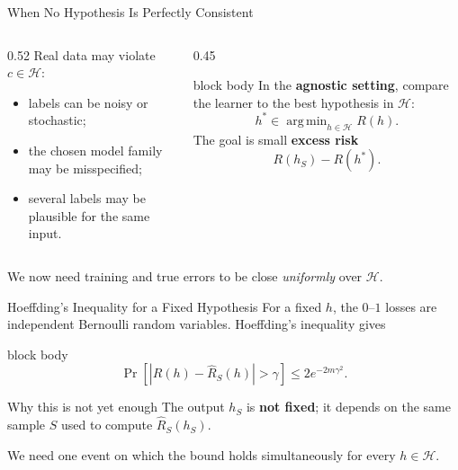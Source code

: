 \documentclass[aspectratio=169,10pt]{beamer}
\DeclareMathOperator*{\argmin}{arg\,min}
\newcommand{\Hc}{\mathcal{H}}
\begin{document}
\begin{frame}[t]{When No Hypothesis Is Perfectly Consistent}
  \vspace{0.18cm}
  \begin{columns}[T,totalwidth=\textwidth]
    \begin{column}{0.52\textwidth}
      {\normalsize Real data may violate $c\in\Hc$:}
      \begin{itemize}
        \setlength{\itemsep}{0.28cm}
        \item labels can be noisy or stochastic;
        \item the chosen model family may be misspecified;
        \item several labels may be plausible for the same input.
      \end{itemize}
    \end{column}
    \begin{column}{0.45\textwidth}
      \begin{beamercolorbox}[rounded=true,sep=0.28cm,wd=\linewidth]{block body}
        {\normalsize In the \textbf{agnostic setting}, compare the learner to the best hypothesis in $\Hc$:
        \[
          h^*\in\argmin_{h\in\Hc}R(h).
        \]
        The goal is small \textbf{excess risk}
        \[
          R(h_S)-R(h^*).
        \]}
      \end{beamercolorbox}
    \end{column}
  \end{columns}
  \vspace{0.30cm}
  \centering
  {\normalsize We now need training and true errors to be close \emph{uniformly} over $\Hc$.}
\end{frame}

\begin{frame}[t]{Hoeffding's Inequality for a Fixed Hypothesis}
  \vspace{0.14cm}
  {\normalsize For a fixed $h$, the $0$--$1$ losses are independent Bernoulli random variables. Hoeffding's inequality gives}
  \begin{beamercolorbox}[rounded=true,sep=0.25cm,wd=0.84\linewidth,center]{block body}
    \centering
    {\fontsize{16}{20}\selectfont
    \[
      \Pr\!\left[\left|R(h)-\widehat R_S(h)\right|>\gamma\right]
      \le 2e^{-2m\gamma^2}.
    \]}
  \end{beamercolorbox}
  \vspace{0.25cm}
  \begin{alertblock}{Why this is not yet enough}
    The output $h_S$ is \textbf{not fixed}; it depends on the same sample $S$ used to compute $\widehat R_S(h_S)$.
  \end{alertblock}
  \vspace{0.12cm}
  \centering
  {\normalsize We need one event on which the bound holds simultaneously for every $h\in\Hc$.}
\end{frame}
\end{document}
